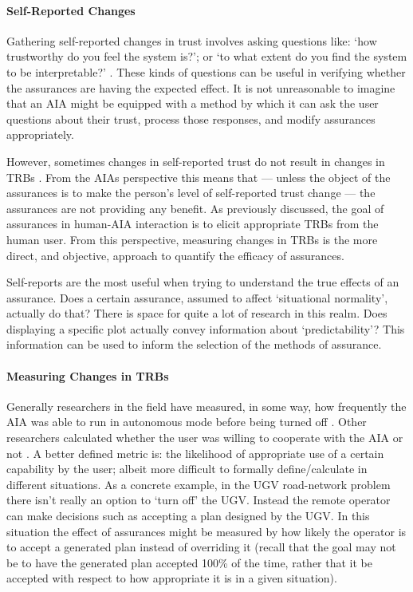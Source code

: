     \paragraph{Self-Reported Changes} Gathering self-reported changes in trust involves asking questions like: `how trustworthy do you feel the system is?'; or `to what extent do you find the system to be interpretable?' \cite{Mcknight2011-gv,Muir1996-gt,Wickens1999-la,Salem2015-md,Kaniarasu2013-ho}. These kinds of questions can be useful in verifying whether the assurances are having the expected effect. It is not unreasonable to imagine that an AIA might be equipped with a method by which it can ask the user questions about their trust, process those responses, and modify assurances appropriately.
    
    However, sometimes changes in self-reported trust do not result in changes in TRBs \cite{Dzindolet2003-ts}. From the AIAs perspective this means that --- unless the object of the assurances is to make the person's level of self-reported trust change --- the assurances are not providing any benefit. As previously discussed, the goal of assurances in human-AIA interaction is to elicit appropriate TRBs from the human user. From this perspective, measuring changes in TRBs is the more direct, and objective, approach to quantify the efficacy of assurances.

    Self-reports are the most useful when trying to understand the true effects of an assurance. Does a certain assurance, assumed to affect `situational normality', actually do that? There is space for quite a lot of research in this realm. Does displaying a specific plot actually convey information about `predictability'? This information can be used to inform the selection of the methods of assurance.

    \paragraph{Measuring Changes in TRBs} Generally researchers in the field have measured, in some way, how frequently the AIA was able to run in autonomous mode before being turned off \cite{Freedy2007-sg,Desai2012-rc}. Other researchers calculated whether the user was willing to cooperate with the AIA or not \cite{Salem2015-md,Wu2016-ei,Bainbridge2011-pl}. A better defined metric is: the likelihood of appropriate use of a certain capability by the user; albeit more difficult to formally define/calculate in different situations. As a concrete example, in the UGV road-network problem there isn't really an option to `turn off' the UGV. Instead the remote operator can make decisions such as accepting a plan designed by the UGV. In this situation the effect of assurances might be measured by how likely the operator is to accept a generated plan instead of overriding it (recall that the goal may not be to have the generated plan accepted 100\% of the time, rather that it be accepted with respect to how appropriate it is in a given situation).

